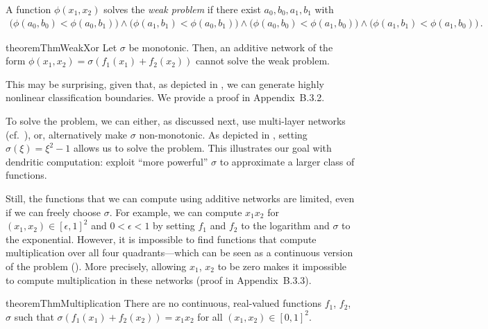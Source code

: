 \begin{definition}
\label{def:weak_xor}
A function $\phi(x_1, x_2)$ solves the \emph{weak \XOR problem} if there exist $a_0, b_0, a_1, b_1$ with
\begin{align*}
	\big( \phi(a_0, b_0) < \phi(a_0, b_1) \big) \wedge
	\big( \phi(a_1, b_1) < \phi(a_0, b_1) \big) \wedge
	\big( \phi(a_0, b_0) < \phi(a_1, b_0) \big) \wedge
	\big( \phi(a_1, b_1) < \phi(a_1, b_0) \big) \,.
\end{align*}
\end{definition}


\begin{restatable}{theorem}{ThmWeakXor}
\label{thm:weak_xor}
Let $\sigma$ be monotonic. Then, an additive network of the form $\phi(x_1, x_2) = \sigma(f_1(x_1) + f_2(x_2))$ cannot solve the weak \XOR problem.
\end{restatable}
This may be surprising, given that, as depicted in , we can generate highly nonlinear classification boundaries.
We provide a proof in Appendix~B.3.2.

To solve the \XOR problem, we can either, as discussed next, use multi-layer networks (cf.~), or, alternatively make $\sigma$ non-monotonic.
As depicted in , setting $\sigma(\xi) = \xi^2 - 1$ allows us to solve the \XOR problem.
This illustrates our goal with dendritic computation: exploit \enquote{more powerful} $\sigma$ to approximate a larger class of functions.

Still, the functions that we can compute using additive networks are limited, even if we can freely choose $\sigma$.
For example, we can compute $x_1 x_2$ for $(x_1, x_2) \in [\epsilon, 1]^2$ and $0 < \epsilon < 1$ by setting $f_1$ and $f_2$ to the logarithm and $\sigma$ to the exponential.
However, it is impossible to find functions that compute multiplication over all four quadrants---which can be seen as a continuous version of the \XOR problem ().
More precisely, allowing $x_1$, $x_2$ to be zero makes it impossible to compute multiplication in these networks (proof in Appendix~B.3.3).
\begin{restatable}{theorem}{ThmMultiplication}
\label{thm:multiplication}
There are no continuous, real-valued functions $f_1$, $f_2$, $\sigma$ such that $\sigma(f_1(x_1) + f_2(x_2)) = x_1 x_2$ for all $(x_1, x_2) \in [0, 1]^2$.
\end{restatable}


